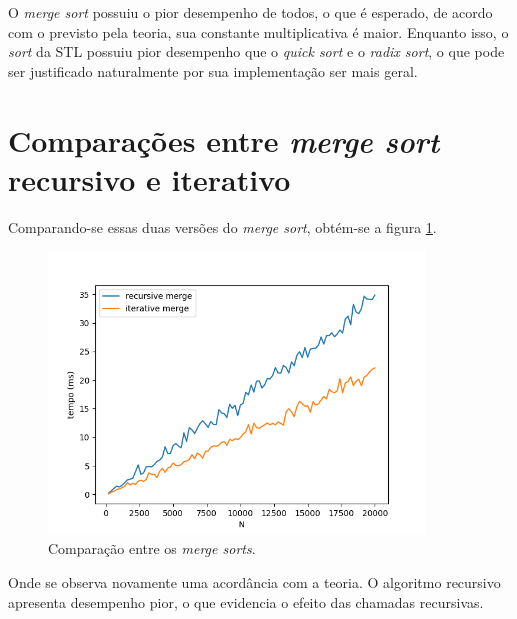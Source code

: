 \documentclass{article}[twocolumn]
\begin{document}
	O \textit{merge sort} possuiu o pior desempenho de todos, o que \'e esperado, de acordo com
	o previsto pela teoria, sua constante multiplicativa \'e maior. Enquanto isso, o \textit{sort}
	da STL possuiu pior desempenho que o \textit{quick sort} e o \textit{radix sort}, o que pode
	ser justificado naturalmente por sua implementa\c{c}\~ao ser mais geral.

	\section{Compara\c{c}\~oes entre \textit{merge sort} recursivo e iterativo}
	Comparando-se essas duas vers\~oes do \textit{merge sort}, obt\'em-se a figura
	\ref{fig:merges}.
	\begin{figure}[H]
		\centering
		\includegraphics[width=10cm]{mergesorts.png}
		\caption{Compara\c{c}\~ao entre os \textit{merge sorts}.}
		\label{fig:merges}
	\end{figure}
	Onde se observa novamente uma acord\^ancia com a teoria. O algoritmo recursivo apresenta
	desempenho pior, o que evidencia o efeito das chamadas recursivas.
\end{document}
